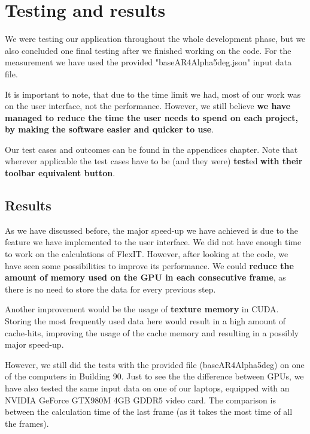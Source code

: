 \documentclass[a4paper, 11pt, article]{report}
\begin{document}

\chapter{Testing and results}

We were testing our application throughout the whole development phase, but we also concluded one final testing after we finished working on the code. For the measurement we have used the provided "baseAR4Alpha5deg.json" input data file.

It is important to note, that due to the time limit we had, most of our work was on the user interface, not the performance. However, we still believe \textbf{we have managed to reduce the time the user needs to spend on each project, by making the software easier and quicker to use}.

Our test cases and outcomes can be found in the appendices chapter. Note that wherever applicable the test cases have to be (and they were) \textbf{test}ed \textbf{with their toolbar equivalent button}.

\section{Results}

As we have discussed before, the major speed-up we have achieved is due to the feature we have implemented to the user interface. We did not have enough time to work on the calculations of FlexIT. However, after looking at the code, we have seen some possibilities to improve its performance. We could \textbf{reduce the amount of memory used on the GPU in each consecutive frame}, as there is no need to store the data for every previous step.

Another improvement would be the usage of \textbf{texture memory} in CUDA. Storing the most frequently used data here would result in a high amount of cache-hits, improving the usage of the cache memory and resulting in a possibly major speed-up.

However, we still did the tests with the provided file (baseAR4Alpha5deg) on one of the computers in Building 90. Just to see the the difference between GPUs, we have also tested the same input data on one of our laptops, equipped with an NVIDIA GeForce GTX980M 4GB GDDR5 video card. The comparison is between the calculation time of the last frame (as it takes the most time of all the frames). 
\end{document}
